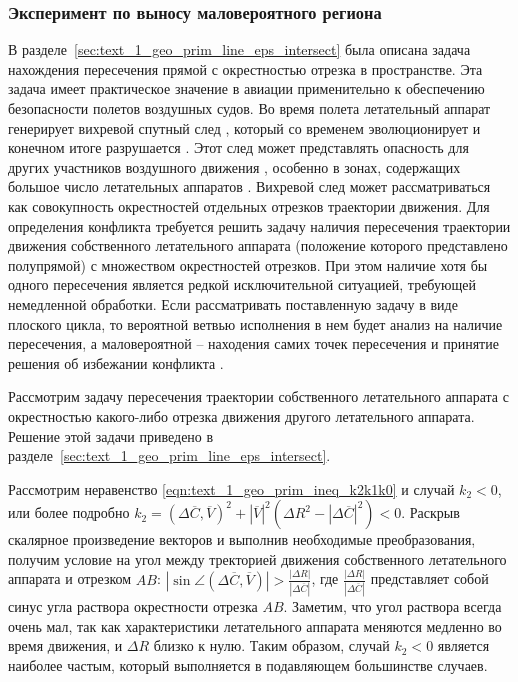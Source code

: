 \subsubsection{Эксперимент по выносу маловероятного региона}

В разделе~\ref{sec:text_1_geo_prim_line_eps_intersect} была описана задача нахождения пересечения прямой с окрестностью отрезка в пространстве.
Эта задача имеет практическое значение в авиации применительно к обеспечению безопасности полетов воздушных судов.
Во время полета летательный аппарат генерирует вихревой спутный след \cite{Aubakirov1999Wake}, который со временем эволюционирует и конечном итоге разрушается \cite{Vyshinsky2006Wake}.
Этот след может представлять опасность для других участников воздушного движения \cite{Babkin2008Wake}, особенно в зонах, содержащих большое число летательных аппаратов \cite{Burluzky2014Wake}.
Вихревой след может рассматриваться как совокупность окрестностей отдельных отрезков траектории движения.
Для определения конфликта требуется решить задачу наличия пересечения траектории движения собственного летательного аппарата (положение которого представлено полупрямой) с множеством окрестностей отрезков.
При этом наличие хотя бы одного пересечения является редкой исключительной ситуацией, требующей немедленной обработки.
Если рассматривать поставленную задачу в виде плоского цикла, то вероятной ветвью исполнения в нем будет анализ на наличие пересечения, а маловероятной -- находения самих точек пересечения и принятие решения об избежании конфликта \cite{Rybakov2017Flight,Rybakov2022VecGeom}.

Рассмотрим задачу пересечения траектории собственного летательного аппарата с окрестностью какого-либо отрезка движения другого летательного аппарата.
Решение этой задачи приведено в разделе~\ref{sec:text_1_geo_prim_line_eps_intersect}.

Рассмотрим неравенство \eqref{eqn:text_1_geo_prim_ineq_k2k1k0} и случай $k_2 < 0$, или более подробно $k_2 = (\Delta \overline{C}, \overline{V})^2 + |\overline{V}|^2 \left( \Delta R^2 - |\Delta \overline{C}|^2 \right) < 0$.
Раскрыв скалярное произведение векторов и выполнив необходимые преобразования, получим условие на угол между тректорией движения собственного летательного аппарата и отрезком $AB$: $\left| \sin{\angle(\Delta \overline{C}, \overline{V})} \right| > \frac{|\Delta R|}{|\Delta \overline{C}|}$, где $\frac{|\Delta R|}{|\Delta \overline{C}|}$ представляет собой синус угла раствора окрестности отрезка $AB$.
Заметим, что угол раствора всегда очень мал, так как характеристики летательного аппарата меняются медленно во время движения, и $\Delta R$ близко к нулю.
Таким образом, случай $k_2 < 0$ является наиболее частым, который выполняется в подавляющем большинстве случаев.

